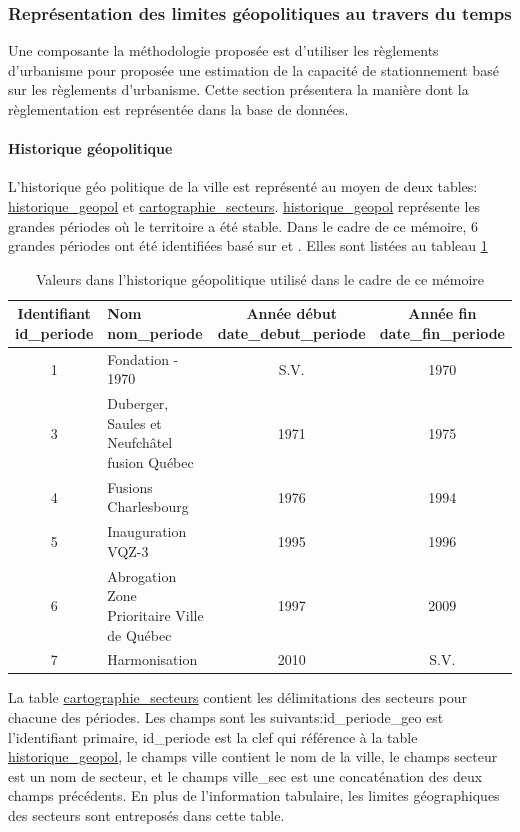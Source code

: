     \subsubsection{Représentation des limites géopolitiques au travers du temps} 
    Une composante la méthodologie proposée est d'utiliser les règlements d'urbanisme pour proposée une estimation de la capacité de stationnement basé sur les règlements d'urbanisme. Cette section présentera la manière dont la règlementation est représentée dans la base de données.
    \paragraph{Historique géopolitique} L'historique géo politique de la ville est représenté au moyen de deux tables: \underline{historique\_geopol} et \underline{cartographie\_secteurs}. \underline{historique\_geopol} représente les grandes périodes où le territoire a été stable. Dans le cadre de ce mémoire, 6 grandes périodes ont été identifiées basé sur \textcite{VilledeQuebec:ReperesChronologique:} et \textcite{ElectionsQuebec:AtlasHistorique:2021}. Elles sont listées au tableau \ref{tab:histo_geopol}
    \begin{table}
    \centering
    \begin{tabular}{c p{5cm} c c}
    \hline
    \makecell{Identifiant\\ id\_periode} & \makecell[l]{Nom \\ nom\_periode} & \makecell{Année début \\ date\_debut\_periode} & \makecell{Année fin \\ date\_fin\_periode}\\ \hline
    1 & Fondation - 1970 &  S.V. & 1970 \\
    3 & Duberger, Saules et Neufchâtel fusion Québec & 1971 & 1975 \\
    4 & Fusions Charlesbourg & 1976 & 1994 \\
    5 & Inauguration VQZ-3 & 1995 & 1996 \\
    6 & Abrogation Zone Prioritaire Ville de Québec & 1997 & 2009 \\
    7 & Harmonisation & 2010 & S.V.\\ \hline
    \end{tabular}
    \caption{Valeurs dans l'historique géopolitique utilisé dans le cadre de ce mémoire}\label{tab:histo_geopol}
    \end{table}
    \FloatBarrier
    La table \underline{cartographie\_secteurs} contient les délimitations des secteurs pour chacune des périodes. Les champs sont les suivants:id\_periode\_geo est l'identifiant primaire, id\_periode est la clef qui référence à la table \underline{historique\_geopol}, le champs ville contient le nom de la ville, le champs secteur est un nom de secteur, et le champs ville\_sec est une concaténation des deux champs précédents. En plus de l'information tabulaire, les limites géographiques des secteurs sont entreposés dans cette table. \par
